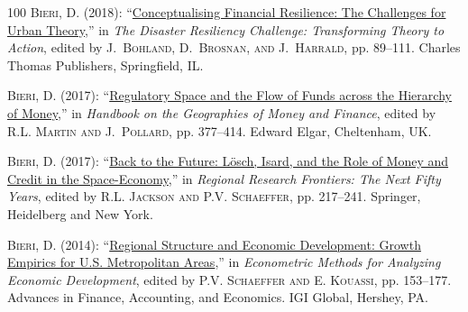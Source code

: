 \documentclass[letter,11pt]{article}
\begin{document}
\begin{thebibliography}{100}
\textsc{Bieri, D.} (2018): \enquote{\href{https://papers.ssrn.com/sol3/papers.cfm?abstract_id=2709820}{Conceptualising Financial Resilience: The Challenges for Urban Theory},} in \emph{The Disaster Resiliency Challenge: Transforming Theory to Action}, edited by \textsc{J.~Bohland, D.~Brosnan, {\small and} J.~Harrald}, pp. 89--111. Charles Thomas Publishers, Springfield, IL.

\textsc{Bieri, D.} (2017): \enquote{\href{https://www.elgaronline.com/view/9781784718992.00024.xml}{Regulatory Space and the Flow of Funds across the Hierarchy of Money},} in \emph{Handbook on the Geographies of Money and Finance}, edited by \textsc{R.L. Martin {\small and} J.~Pollard}, pp. 377--414. Edward Elgar, Cheltenham, UK.

\textsc{Bieri, D.} (2017): \enquote{\href{https://link.springer.com/chapter/10.1007/978-3-319-50547-3_14}{Back to the Future: L\"{o}sch, Isard, and the Role of Money and Credit in the Space-Economy},} in \emph{Regional Research Frontiers: The Next Fifty Years}, edited by \textsc{R.L. Jackson {\small and} P.V. Schaeffer}, pp. 217--241. Springer, Heidelberg and New York.

\textsc{Bieri, D.}  (2014): \enquote{\href{https://www.igi-global.com/chapter/regional-structure-and-economic-development/79698}{Regional Structure and Economic Development: Growth Empirics for U.S. Metropolitan Areas},} in \emph{Econometric Methods for Analyzing Economic Development}, edited by \textsc{P.V. Schaeffer {\small and} E. Kouassi}, pp. 153--177. Advances in Finance, Accounting, and Economics. IGI Global, Hershey, PA.
\end{thebibliography}
\endgroup
\end{document}

